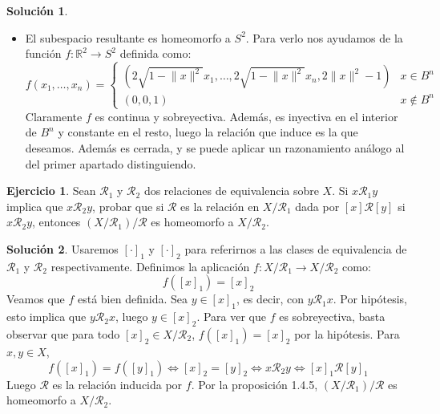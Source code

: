 \documentclass{article}
\theoremstyle{plain}
\theoremstyle{definition}
\newtheorem{exercise}{Ejercicio}
\newtheorem*{sol*}{Solución}
\providecommand{\norm}[1]{\lVert#1\rVert}
\begin{document}
\begin{sol*}
\begin{itemize}
	\item El subespacio resultante es homeomorfo a $S^2$. Para verlo nos ayudamos de la función $f:\mathbb{R}^2\to S^2$ definida como:
\[ f(x_1,\dots,x_n) = \begin{cases}
(2 \sqrt{1-\norm{x}^2}x_1, \dots, 2 \sqrt{1-\norm{x}^2}x_n, 2 \norm{x}^2-1) & x\in B^n\\
(0,0,1) & x\not \in B^n
\end{cases} \]
Claramente $f$ es continua y sobreyectiva. Además, es inyectiva en el interior de $B^n$ y constante en el resto, luego la relación que induce es la que deseamos. Además es cerrada, y se puede aplicar un razonamiento análogo al del primer apartado distinguiendo. 
\end{itemize}
\end{sol*}


\newpage
\begin{exercise}
Sean $\mathcal{R}_1$ y $\mathcal{R}_2$ dos relaciones de equivalencia sobre $X$. Si $x \mathcal{R}_1 y$ implica que $x \mathcal{R}_2 y$, probar que si $\mathcal{R}$ es la relación en $X/\mathcal{R}_1$ dada por $[x] \mathcal{R} [y]$ si $x \mathcal{R}_2 y$, entonces $(X/\mathcal{R}_1)/\mathcal{R}$ es homeomorfo a $X / \mathcal{R}_2$.
\end{exercise}
\begin{sol*}
Usaremos $[\cdot]_1$ y $[\cdot]_2$ para referirnos a las clases de equivalencia de $\mathcal{R}_1$ y $\mathcal{R}_2$ respectivamente. Definimos la aplicación $f : X/\mathcal{R}_1 \to X/\mathcal{R}_2$ como:
\[ f ([x]_1) = [x]_2 \]
Veamos que $f$ está bien definida. Sea $y \in [x]_1$, es decir, con $y \mathcal{R}_1 x$. Por hipótesis, esto implica que $y \mathcal{R}_2 x$, luego $y \in [x]_2$. Para ver que $f$ es sobreyectiva, basta observar que para todo $[x]_2 \in X/\mathcal{R}_2$, $f([x]_1) = [x]_2$ por la hipótesis. Para $x,y \in X$, 
	\[ f([x]_1) = f([y]_1) \Leftrightarrow [x]_2 = [y]_2 \Leftrightarrow x \mathcal{R}_2 y \Leftrightarrow [x]_1 \mathcal{R} [y]_1 \]
	Luego $\mathcal{R}$ es la relación inducida por $f$. Por la proposición 1.4.5,  $(X/\mathcal{R}_1)/\mathcal{R}$ es homeomorfo a $X/\mathcal{R}_2$.
\end{sol*}
\end{document}
